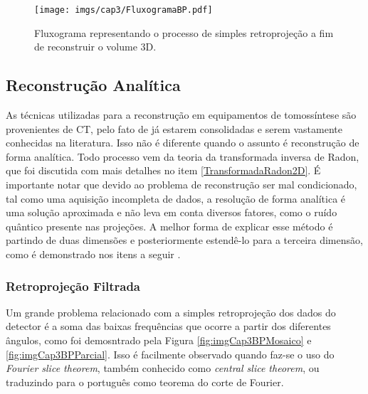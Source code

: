 \begin{figure}[H]
	\caption{Fluxograma representando o processo de simples retroprojeção a fim de reconstruir o volume \acs{3D}.}
	\begin{center}
		\texttt{[image: imgs/cap3/FluxogramaBP.pdf]}
	\end{center}
	\label{fig:imgCap3FluxogramaBP}
\end{figure}


\subsection{Reconstrução Analítica}

As técnicas utilizadas para a reconstrução em equipamentos de tomossíntese são provenientes de \acs{CT}, pelo fato de já estarem consolidadas e serem vastamente conhecidas na literatura. Isso não é diferente quando o assunto é reconstrução de forma analítica. Todo processo vem da teoria da transformada inversa de Radon, que foi discutida com mais detalhes no item \ref{TransformadaRadon2D}. É importante notar que devido ao problema de reconstrução ser mal condicionado, tal como uma aquisição incompleta de dados, a resolução de forma analítica é uma solução aproximada e não leva em conta diversos fatores, como o ruído quântico presente nas projeções. A melhor forma de explicar esse método é partindo de duas dimensões e posteriormente estendê-lo para a terceira dimensão, como é demonstrado nos itens a seguir \cite{mertelmeier2014filtered,xu2014tomographic}.  


\subsubsection{Retroprojeção Filtrada}\label{RetroprojeçãoFiltrada}

Um grande problema relacionado com a simples retroprojeção dos dados do detector é a soma das baixas frequências que ocorre a partir dos diferentes ângulos, como foi demosntrado pela Figura \ref{fig:imgCap3BPMosaico} e \ref{fig:imgCap3BPParcial}. Isso é facilmente observado quando faz-se o uso do \textit{Fourier slice theorem}, também conhecido como \textit{central slice theorem}, ou traduzindo para o português como teorema do corte de Fourier. 

